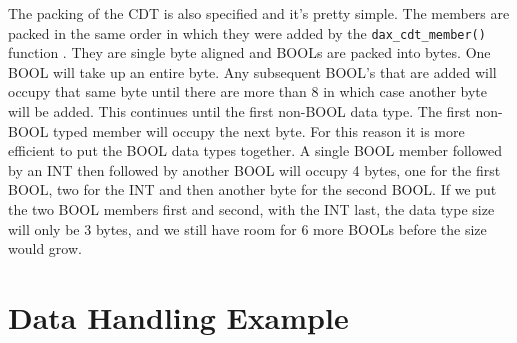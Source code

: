 The packing of the CDT is also specified and it's pretty simple.  The members are packed in the same order in which they were added by the  \verb|dax_cdt_member()| function .  They are single byte aligned and BOOLs are packed into bytes.  One BOOL will take up an entire byte.  Any subsequent BOOL's that are added will occupy that same byte until there are more than 8 in which case another byte will be added.  This continues until the first non-BOOL data type.  The first non-BOOL typed member will occupy the next byte.  For this reason it is more efficient to put the BOOL data types together.  A single BOOL member followed by an INT then followed by another BOOL will occupy 4 bytes, one for the first BOOL, two for the INT and then another byte for the second BOOL.  If we put the two BOOL members first and second, with the INT last, the data type size will only be 3 bytes, and we still have room for 6 more BOOLs before the size would grow.

\section{Data Handling Example}
